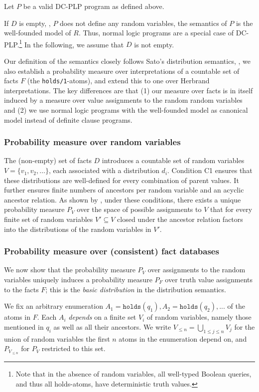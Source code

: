 Let $P$ be a valid DC-PLP program as defined above.

If $D$ is empty, \ie, $P$ does not define any random variables,  the semantics of $P$ is the well-founded model of $R$. Thus, normal logic programs are a special case of DC-PLP.\footnote{Note that in the absence of random variables, all well-typed Boolean queries, and thus all holds-atoms, have deterministic truth values.} In the following, we assume that $D$ is not empty. 

Our definition of the semantics closely follows Sato's distribution semantics, \ie, we also establish a probability measure over interpretations of a countable set of facts $F$ (the \verb|holds/1|-atoms), and extend this to one over Herbrand interpretations. The key differences are that (1) our measure over facts is in itself induced by a measure over value assignments to the random random variables and (2) we use normal logic programs with the well-founded model as canonical model instead of definite clause programs.


\subsubsection{Probability measure over random variables}
The (non-empty) set of facts $D$ introduces a  countable set of random variables $V=\{v_1,v_2,\ldots\}$, each associated with a distribution $d_i$.  Condition C1 ensures that these distributions are well-defined for every combination of parent values. It further ensures finite numbers of ancestors per random variable and an acyclic ancestor relation. As shown by  \citeauthor{kersting2000bayesian} \cite[Theorem 4.9]{kersting2000bayesian}, under these conditions, there exists a unique probability measure $P_V$ over the space of possible assignments to $V$ that for every finite set of random variables $V'\subseteq V$ closed under the ancestor relation factors into the distributions of the random variables in $V'$.

\subsubsection{Probability measure over (consistent) fact databases}
We now show that the probability measure $P_V$ over assignments to the random variables uniquely induces a probability measure $P_F$ over truth value assignments to the facts $F$; this is the \emph{basic distribution} in the distribution semantics.

We fix an arbitrary enumeration  $A_1=\mathtt{holds}(q_1),A_2=\mathtt{holds}(q_2),...$ of the atoms in $F$. 
Each $A_i$ \emph{depends} on a finite set $V_i$ of random variables, namely  those mentioned in $q_i$ as well as all their ancestors. We write $V_{\leq n}=\bigcup_{1\leq j\leq n}V_j $ for the union of random variables the first $n$ atoms in the enumeration depend on, and $P_{V_{\leq n}}$ for $P_V$ restricted to this set.  

